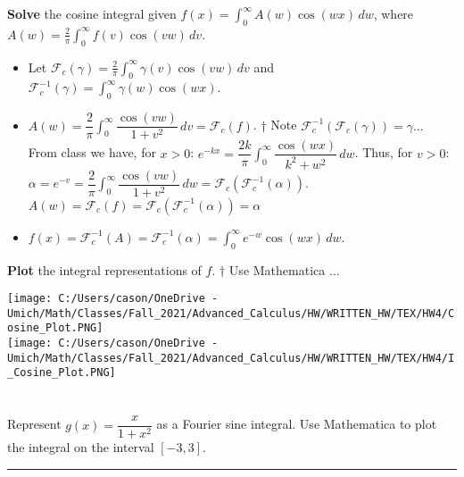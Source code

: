 \documentclass[10pt]{article}
\begin{document}
\noindent
\textbf{Solve} the cosine integral given $ \displaystyle f(x) = \int_{0}^{\infty} A(w) \cos(wx) \,dw $, where $ \displaystyle A(w) = \frac{2}{\pi} \int_{0}^{\infty} f(v) \cos(vw) \,dv $. \\

\begin{itemize}
    \item Let $ \displaystyle \mathcal{F}_c(\gamma) = \frac{2}{\pi} \int_{0}^{\infty} \gamma(v) \cos(vw) \,dv $ and $ \displaystyle \mathcal{F}_c^{-1}(\gamma) = \int_{0}^{\infty} \gamma(w) \cos(wx) $. \\
    \item $ \displaystyle A(w) = \dfrac{2}{\pi} \int_{0}^{\infty} \dfrac{\cos(vw)}{1 + v^2} \,dv = \mathcal{F}_c(f) $. $ \dagger $ Note $ \mathcal{F}_c^{-1}(\mathcal{F}_c(\gamma)) = \gamma \dots $ \\
    \subitem From class we have, for $ x > 0 $: $ \displaystyle e^{-kx} = \dfrac{2k}{\pi} \int_{0}^{\infty} \dfrac{\cos(wx)}{k^2 + w^2} \,dw $.
    \subitem Thus, for $ v > 0 $: $ \displaystyle \alpha = e^{-v} = \dfrac{2}{\pi} \int_{0}^{\infty} \dfrac{\cos(vw)}{1 + v^2} \,dw = \mathcal{F}_c(\mathcal{F}_c^{-1}(\alpha)) $.
    \subitem $ \displaystyle A(w) = \mathcal{F}_c(f) = \mathcal{F}_c(\mathcal{F}_c^{-1}(\alpha)) = \alpha $
    \item $ \displaystyle f(x) = \mathcal{F}_c^{-1}(A) = \mathcal{F}_c^{-1}(\alpha) = \int_{0}^{\infty} e^{-w} \cos(wx) \,dw $. \\
\end{itemize}

\noindent
\textbf{Plot} the integral representations of $ f $. $ \dagger $ Use Mathematica $ \dots $ \\

\begin{center}
    \texttt{[image: C:/Users/cason/OneDrive - Umich/Math/Classes/Fall\_2021/Advanced\_Calculus/HW/WRITTEN\_HW/TEX/HW4/Cosine\_Plot.PNG]} \\
    \texttt{[image: C:/Users/cason/OneDrive - Umich/Math/Classes/Fall\_2021/Advanced\_Calculus/HW/WRITTEN\_HW/TEX/HW4/I\_Cosine\_Plot.PNG]} \\
\end{center}

\newpage

\section{\underline{}}
\label{sec: Problem 2}
\noindent
Represent $ g(x) = \dfrac{x}{1+x^2} $ as a Fourier sine integral. Use Mathematica to plot the integral on the interval $[-3,3]$.
\vspace{2.5mm}
\hrule 
\end{document}
